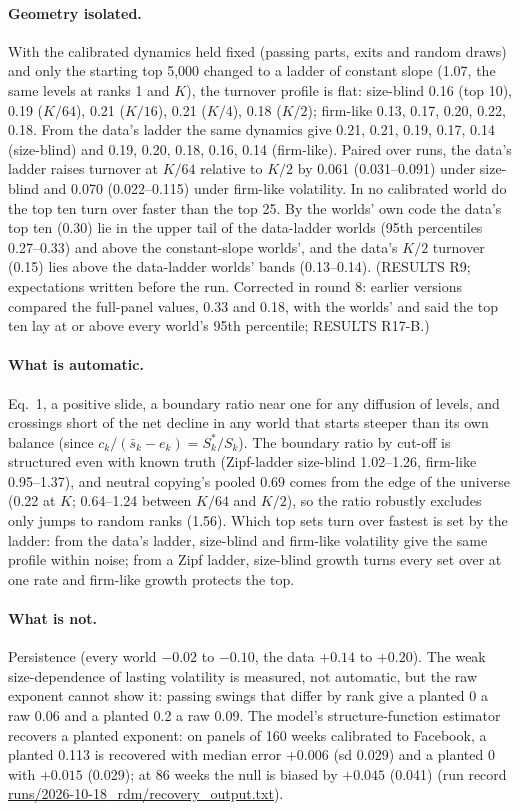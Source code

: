 \documentclass[10pt]{article}
\begin{document}
\paragraph{Geometry isolated.} With the calibrated dynamics held fixed (passing parts, exits and random draws) and only the starting top 5,000 changed to a ladder of constant slope (1.07, the same levels at ranks 1 and $K$), the turnover profile is flat: size-blind 0.16 (top 10), 0.19 ($K/64$), 0.21 ($K/16$), 0.21 ($K/4$), 0.18 ($K/2$); firm-like 0.13, 0.17, 0.20, 0.22, 0.18. From the data's ladder the same dynamics give 0.21, 0.21, 0.19, 0.17, 0.14 (size-blind) and 0.19, 0.20, 0.18, 0.16, 0.14 (firm-like). Paired over runs, the data's ladder raises turnover at $K/64$ relative to $K/2$ by 0.061 (0.031--0.091) under size-blind and 0.070 (0.022--0.115) under firm-like volatility. In no calibrated world do the top ten turn over faster than the top 25. By the worlds' own code the data's top ten (0.30) lie in the upper tail of the data-ladder worlds (95th percentiles 0.27--0.33) and above the constant-slope worlds', and the data's $K/2$ turnover (0.15) lies above the data-ladder worlds' bands (0.13--0.14). (RESULTS R9; expectations written before the run. Corrected in round 8: earlier versions compared the full-panel values, 0.33 and 0.18, with the worlds' and said the top ten lay at or above every world's 95th percentile; RESULTS R17-B.)
\paragraph{What is automatic.} Eq.~1, a positive slide, a boundary ratio near one for any diffusion of levels, and crossings short of the net decline in any world that starts steeper than its own balance (since $c_k/(\bar s_k - e_k) = S^\ast_k/S_k$). The boundary ratio by cut-off is structured even with known truth (Zipf-ladder size-blind 1.02--1.26, firm-like 0.95--1.37), and neutral copying's pooled 0.69 comes from the edge of the universe (0.22 at $K$; 0.64--1.24 between $K/64$ and $K/2$), so the ratio robustly excludes only jumps to random ranks (1.56). Which top sets turn over fastest is set by the ladder: from the data's ladder, size-blind and firm-like volatility give the same profile within noise; from a Zipf ladder, size-blind growth turns every set over at one rate and firm-like growth protects the top.

\paragraph{What is not.} Persistence (every world $-0.02$ to $-0.10$, the data $+0.14$ to $+0.20$). The weak size-dependence of lasting volatility is measured, not automatic, but the raw exponent cannot show it: passing swings that differ by rank give a planted 0 a raw 0.06 and a planted 0.2 a raw 0.09. The model's structure-function estimator recovers a planted exponent: on panels of 160 weeks calibrated to Facebook, a planted 0.113 is recovered with median error $+0.006$ (sd 0.029) and a planted 0 with $+0.015$ (0.029); at 86 weeks the null is biased by $+0.045$ (0.041) (run record \url{runs/2026-10-18_rdm/recovery_output.txt}).
\end{document}
